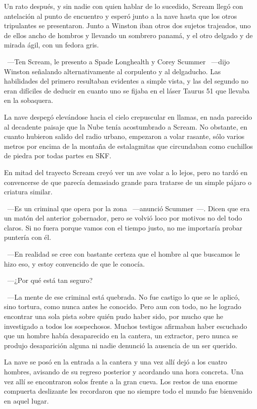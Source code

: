 \noindent{}Un rato después, y sin nadie con quien hablar de lo sucedido, Scream llegó con antelación al punto de encuentro y esperó junto a la nave hasta que los otros tripulantes se presentaron. Junto a Winston iban otros dos sujetos trajeados, uno de ellos ancho de hombros y llevando un sombrero panamá, y el otro delgado y de mirada ágil, con un fedora gris.

~---Ten Scream, le presento a Spade Longhealth y Corey Scummer ~---dijo Winston señalando alternativamente al corpulento y al delgaducho. Las habilidades del primero resultaban evidentes a simple vista, y las del segundo no eran difíciles de deducir en cuanto uno se fijaba en el láser Taurus 51 que llevaba en la sobaquera.

La nave despegó elevándose hacia el cielo crepuscular en llamas, en nada parecido al decadente paisaje que la Nube tenía acostumbrado a Scream. No obstante, en cuanto hubieron salido del radio urbano, empezaron a volar rasante, sólo varios metros por encima de la montaña de estalagmitas que circundaban como cuchillos de piedra por todas partes en SKF.

En mitad del trayecto Scream creyó ver un ave volar a lo lejos, pero no tardó en convencerse de que parecía demasiado grande para tratarse de un simple pájaro o criatura similar.

~---Es un criminal que opera por la zona ~---anunció Scummer~---. Dicen que era un matón del anterior gobernador, pero se volvió loco por motivos no del todo claros. Si no fuera porque vamos con el tiempo justo, no me importaría probar puntería con él.

~---En realidad se cree con bastante certeza que el hombre al que buscamos le hizo eso, y estoy convencido de que le conocía.

~---¿Por qué está tan seguro?

~---La mente de ese criminal está quebrada. No fue castigo lo que se le aplicó, sino tortura, como nunca antes he conocido. Pero aun con todo, no he logrado encontrar una sola pista sobre quién pudo haber sido, por mucho que he investigado a todos los sospechosos. Muchos testigos afirmaban haber escuchado que un hombre había desaparecido en la cantera, un extractor, pero nunca se produjo desaparición alguna ni nadie denunció la ausencia de un ser querido.

La nave se posó en la entrada a la cantera y una vez allí dejó a los cuatro hombres, avisando de su regreso posterior y acordando una hora concreta. Una vez allí se encontraron solos frente a la gran cueva. Los restos de una enorme compuerta deslizante les recordaron que no siempre todo el mundo fue bienvenido en aquel lugar.

